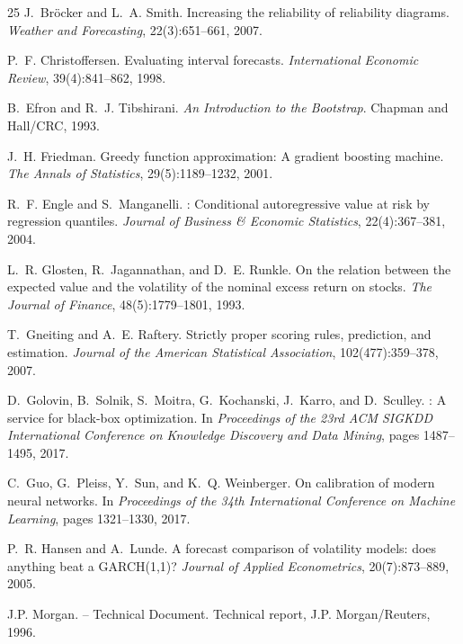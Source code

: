 \documentclass[11pt,a4paper]{article}
\begin{document}
\begin{thebibliography}{25}
J.~Br{\"o}cker and L.~A. Smith.
\newblock Increasing the reliability of reliability diagrams.
\newblock \emph{Weather and Forecasting}, 22(3):651--661, 2007.

P.~F. Christoffersen.
\newblock Evaluating interval forecasts.
\newblock \emph{International Economic Review}, 39(4):841--862, 1998.

B.~Efron and R.~J. Tibshirani.
\newblock \emph{An Introduction to the Bootstrap}.
\newblock Chapman and Hall/CRC, 1993.

J.~H. Friedman.
\newblock Greedy function approximation: A gradient boosting machine.
\newblock \emph{The Annals of Statistics}, 29(5):1189--1232, 2001.

R.~F. Engle and S.~Manganelli.
: Conditional autoregressive value at risk by regression quantiles.
\newblock \emph{Journal of Business \& Economic Statistics}, 22(4):367--381, 2004.

L.~R. Glosten, R.~Jagannathan, and D.~E. Runkle.
\newblock On the relation between the expected value and the volatility of the nominal excess return on stocks.
\newblock \emph{The Journal of Finance}, 48(5):1779--1801, 1993.

T.~Gneiting and A.~E. Raftery.
\newblock Strictly proper scoring rules, prediction, and estimation.
\newblock \emph{Journal of the American Statistical Association}, 102(477):359--378, 2007.

D.~Golovin, B.~Solnik, S.~Moitra, G.~Kochanski, J.~Karro, and D.~Sculley.
: A service for black-box optimization.
\newblock In \emph{Proceedings of the 23rd ACM SIGKDD International Conference on Knowledge Discovery and Data Mining}, pages 1487--1495, 2017.

C.~Guo, G.~Pleiss, Y.~Sun, and K.~Q. Weinberger.
\newblock On calibration of modern neural networks.
\newblock In \emph{Proceedings of the 34th International Conference on Machine Learning}, pages 1321--1330, 2017.

P.~R. Hansen and A.~Lunde.
\newblock A forecast comparison of volatility models: does anything beat a {GARCH}(1,1)?
\newblock \emph{Journal of Applied Econometrics}, 20(7):873--889, 2005.

{J.P. Morgan}.
 -- Technical Document.
\newblock Technical report, J.P. Morgan/Reuters, 1996.


\end{thebibliography}
\end{document}
